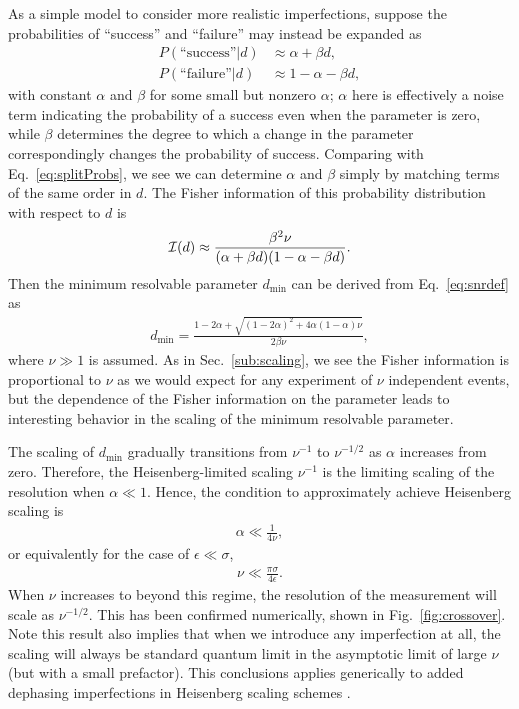 As a simple model to consider more realistic imperfections, suppose the probabilities of ``success'' and ``failure'' may instead be expanded as
\begin{align}\label{eq:pracprob}
\nonumber P(\text{``success''}|d) &\approx \alpha + \beta d,\\
P(\text{``failure''}|d) &\approx 1-\alpha-\beta d,
\end{align}
with constant $\alpha$ and $\beta$ for some small but nonzero $\alpha$; $\alpha$ here is effectively a noise term indicating the probability of a success even when the parameter is zero, while $\beta$ determines the degree to which a change in the parameter correspondingly changes the probability of success. 
Comparing with Eq.~\eqref{eq:splitProbs}, we see we can determine $\alpha$ and $\beta$ simply by matching terms of the same order in $d$. 
The Fisher information of this probability distribution with respect to $d$ is
\begin{align}
\mathcal{I}(d)\approx\frac{\beta^2\nu}{(\alpha + \beta d)(1-\alpha - \beta d)}.
\end{align}
Then the minimum resolvable parameter $d_{\min}$ can be derived from Eq.~\eqref{eq:snrdef} as
\begin{align}
d_{\min}=\frac{1-2\alpha+\sqrt{(1-2\alpha)^2+4\alpha(1-\alpha)\nu}}{2\beta\nu},
\end{align}
where $\nu \gg 1$ is assumed.
As in Sec.~\ref{sub:scaling}, we see the Fisher information is proportional to $\nu$ as we would expect for any experiment of $\nu$ independent events, but the dependence of the Fisher information on the parameter leads to interesting behavior in the scaling of the minimum resolvable parameter.

The scaling of $d_{\min}$ gradually transitions from $\nu^{-1}$ to $\nu^{-1/2}$ as $\alpha$ increases from zero. 
Therefore, the Heisenberg-limited scaling $\nu^{-1}$ is the limiting scaling of the resolution when $\alpha\ll1$. 
Hence, the condition to approximately achieve Heisenberg scaling is
\begin{align}
\alpha \ll \frac{1}{4\nu},
\end{align}
or equivalently for the case of $\epsilon \ll \sigma$,
\begin{align}\label{eq:heisenberg number}
\nu  \ll  \frac{\pi \sigma}{4 \epsilon}.
\end{align}
When $\nu$ increases to beyond this regime, the resolution of the measurement will scale as $\nu^{-1/2}$.
This has been confirmed numerically, shown in Fig.~\ref{fig:crossover}.
Note this result also implies that when we introduce any imperfection at all, the scaling will always be standard quantum limit in the asymptotic limit of large $\nu$ (but with a small prefactor).  This conclusions applies generically to added dephasing imperfections in Heisenberg scaling schemes \cite{bardhan2013effects,demkowicz2012elusive,jordan2015heisenberg}.

